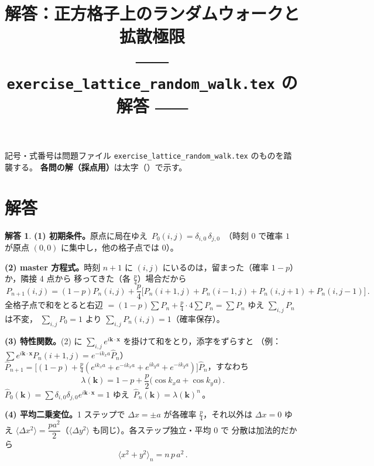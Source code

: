 \documentclass[dvipdfmx, uplatex]{jsarticle}
\title{解答：正方格子上のランダムウォークと拡散極限\\
\large ―― \texttt{exercise\_lattice\_random\_walk.tex} の解答 ――}
\author{}
\date{}
\newcommand{\bk}{\bm{k}}
\newcommand{\bx}{\bm{x}}
\theoremstyle{definition}
\newtheorem*{sol}{解答}
\begin{document}
\maketitle
\vspace{-6zh}

記号・式番号は問題ファイル \texttt{exercise\_lattice\_random\_walk.tex} のものを踏襲する。
\textbf{各問の解（採点用）}は太字（\boxed）で示す。

\section{解答}

\begin{sol}
\textbf{(1) 初期条件。}原点に局在ゆえ $\boxed{\,P_0(i,j)=\delta_{i,0}\,\delta_{j,0}\,}$
（時刻 $0$ で確率 $1$ が原点 $(0,0)$ に集中し，他の格子点では $0$）。

\par\smallskip
\textbf{(2) master 方程式。}時刻 $n+1$ に $(i,j)$ にいるのは，留まった（確率 $1-p$）か，隣接 4 点から
移ってきた（各 $\tfrac p4$）場合だから
\[
    \boxed{\,P_{n+1}(i,j)=(1-p)P_n(i,j)+\frac{p}{4}\bigl[P_n(i{+}1,j)+P_n(i{-}1,j)+P_n(i,j{+}1)+P_n(i,j{-}1)\bigr]\,}.
\]
全格子点で和をとると右辺 $=(1-p)\sum P_n+\tfrac p4\cdot4\sum P_n=\sum P_n$ ゆえ $\sum_{i,j}P_n$ は不変，
$\sum_{i,j}P_0=1$ より $\boxed{\sum_{i,j}P_n(i,j)=1}$（確率保存）。

\par\smallskip
\textbf{(3) 特性関数。}(2) に $\sum_{i,j}e^{i\bk\cdot\bx}$ を掛けて和をとり，添字をずらすと
（例：$\sum e^{i\bk\cdot\bx}P_n(i{+}1,j)=e^{-ik_xa}\hat P_n$）
$\hat P_{n+1}=\bigl[(1-p)+\tfrac p4(e^{ik_xa}+e^{-ik_xa}+e^{ik_ya}+e^{-ik_ya})\bigr]\hat P_n$，すなわち
\[
    \boxed{\,\lambda(\bk)=1-p+\frac{p}{2}\bigl(\cos k_xa+\cos k_ya\bigr)\,}.
\]
$\hat P_0(\bk)=\sum\delta_{i,0}\delta_{j,0}e^{i\bk\cdot\bx}=1$ ゆえ $\boxed{\,\hat P_n(\bk)=\lambda(\bk)^n\,}$。

\par\smallskip
\textbf{(4) 平均二乗変位。}1 ステップで $\Delta x=\pm a$ が各確率 $\tfrac p4$，それ以外は $\Delta x=0$ ゆえ
$\langle\Delta x^2\rangle=\boxed{\dfrac{pa^2}{2}}$（$\langle\Delta y^2\rangle$ も同じ）。各ステップ独立・平均 $0$ で
分散は加法的だから
\[
    \boxed{\,\langle x^2+y^2\rangle_n=n\,p\,a^2\,}.
\]


\end{sol}
\end{document}

